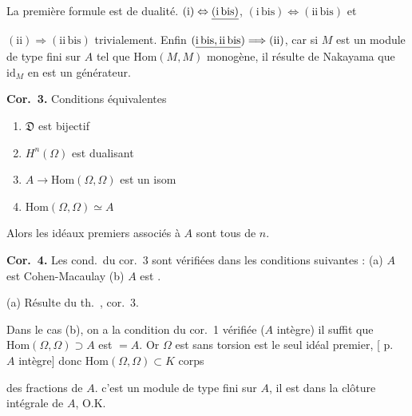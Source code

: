 \documentclass[11pt,a4paper]{article}
\begin{document}
La première formule est de dualité.
$(\mathrm{i}) \Leftrightarrow \uncertain{(\mathrm{i\,bis})}$,
\struck{\ill{}} $(\mathrm{i\,bis}) \Leftrightarrow (\mathrm{ii\,bis})$ et

$(\mathrm{ii}) \Longrightarrow (\mathrm{ii\,bis})$ trivialement. Enfin
$(\uncertain{\mathrm{i\,bis}, \mathrm{ii\,bis}}) \Longrightarrow
(\mathrm{ii})$, car si $M$ est un module de type fini sur $A$ tel que
$\mathrm{Hom}(M, M)$  monogène, il résulte de Nakayama que
$\mathrm{id}_M$ en est un générateur.

\textbf{Cor.\ 3.} Conditions équivalentes
\begin{enumerate}
  \item[(i)] $\mathfrak{D}$ est bijectif
  \item[(ii)] $H^n(\Omega)$ est dualisant
  \item[(iii)] $A \to \mathrm{Hom}(\Omega, \Omega)$ est un isom
  \item[(iv)] $\mathrm{Hom}(\Omega, \Omega) \simeq A$
\end{enumerate}
\struck{\ill{}} Alors \struck{\ill{}} les idéaux premiers associés à $A$
sont tous de   $n$.

\textbf{Cor.\ 4.} Les cond.\ du cor.\ 3 sont vérifiées dans les conditions
suivantes : (a) $A$ est Cohen-Macaulay \qquad (b) $A$ est
.

(a) Résulte du th.\ , cor.\ 3.

Dans le cas (b), on a la condition du cor.\ 1 vérifiée
($A$  intègre) il suffit  que
$\mathrm{Hom}(\Omega, \Omega) \supset A$ est \ill{} \ill{} $= A$. Or $\Omega$
est sans torsion  est le seul idéal premier,
[ p.\  \ill{} $A$ intègre] donc
$\mathrm{Hom}(\Omega, \Omega) \subset K$ corps

des fractions de $A$.  c'est un module de type fini sur $A$,
il est dans la clôture intégrale de $A$, O.K.
\end{document}
